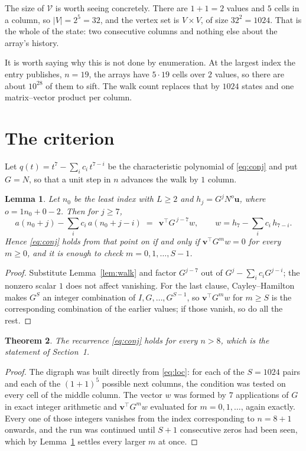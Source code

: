 \documentclass[11pt,a4paper]{article}
\theoremstyle{plain}
\newtheorem{theorem}{Theorem}
\newtheorem{lemma}[theorem]{Lemma}
\theoremstyle{definition}
\begin{document}
The size of $\mathcal V$ is worth seeing concretely. There are $1+1=2$ values
and $5$ cells in a column, so $|V|=2^{5}=32$, and the vertex set is
$V\times V$, of size $32^2=1024$. That is the whole of the state: two consecutive
columns and nothing else about the array's history.

It is worth saying why this is not done by enumeration. At the largest index the entry
publishes, $n=19$, the arrays have $5\cdot19$ cells over
$2$ values, so there are about $10^{28}$ of them to sift. The
walk count replaces that by $1024$ states and one matrix--vector product per column.
\section{The criterion}

Let $q(t)=t^{7}-\sum_i c_i\,t^{7-i}$ be the characteristic polynomial of
\eqref{eq:conj} and put $G=N$, so that a unit step in $n$ advances the walk by
$1$ column.

\begin{lemma}\label{lem:crit}
Let $n_0$ be the least index with $L\ge2$ and $h_j=G^{j}N^{o}\mathbf{u}$, where
$o=1n_0+0-2$. Then for $j\ge7$,
\[
a(n_0+j)-\sum_i c_i\,a(n_0+j-i)\;=\;\,\mathbf{v}^{\!\top}G^{\,j-7}w,
\qquad w=h_{7}-\sum_i c_i\,h_{7-i} .
\]
Hence \eqref{eq:conj} holds from that point on if and only if
$\mathbf{v}^{\!\top}G^{m}w=0$ for every $m\ge0$, and it is enough to check
$m=0,1,\dots,S-1$.
\end{lemma}

\begin{proof}
Substitute Lemma~\ref{lem:walk} and factor $G^{j-7}$ out of
$G^{j}-\sum_ic_iG^{j-i}$; the nonzero scalar $1$ does not affect
vanishing. For the last clause, Cayley--Hamilton makes $G^{S}$ an integer combination of
$I,G,\dots,G^{S-1}$, so $\mathbf{v}^{\!\top}G^{m}w$ for $m\ge S$ is the corresponding
combination of the earlier values; if those vanish, so do all the rest.
\end{proof}

\begin{theorem}
The recurrence \eqref{eq:conj} holds for every $n>8$, which is the statement of
Section~1.
\end{theorem}

\begin{proof}
The digraph was built directly from \eqref{eq:loc}: for each of the $S=1024$ pairs and each
of the $(1+1)^{5}$ possible next columns, the condition was tested on every cell of
the middle column. The vector $w$ was formed by $7$ applications of $G$ in exact integer
arithmetic and $\mathbf{v}^{\!\top}G^{m}w$ evaluated for $m=0,1,\dots$, again exactly.
Every one of those integers vanishes from the index corresponding to $n=8+1$ onwards,
and the run was continued until $S+1$ consecutive zeros had been seen, which by
Lemma~\ref{lem:crit} settles every larger $m$ at once.
\end{proof}
\end{document}
